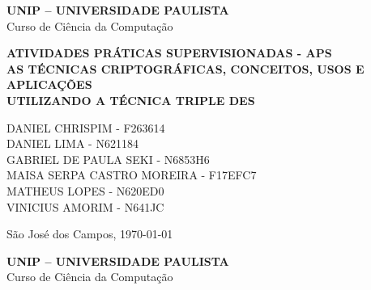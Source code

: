 \setmainfont{Arial}
\begin{titlepage} 

	\begin{center}
\begin{minipage}{1\textwidth} %
    \large
    \centering
    
        {\LARGE\bfseries UNIP – UNIVERSIDADE PAULISTA\\}
        {\LARGE Curso de Ciência da Computação}
\end{minipage}
\end{center}

  \begin{minipage}{\linewidth}
    \centering
  \end{minipage}
	
\vspace*{2in} %
	
\begin{center}

{\large\bfseries ATIVIDADES PRÁTICAS SUPERVISIONADAS - APS }\\[0.4cm] %
{\bfseries AS TÉCNICAS CRIPTOGRÁFICAS, CONCEITOS, USOS E APLICAÇÕES\\UTILIZANDO A TÉCNICA TRIPLE DES}\\[0.2cm]

\vfill

DANIEL CHRISPIM - F263614\\
DANIEL LIMA - N621184\\
GABRIEL DE PAULA SEKI - N6853H6\\
MAISA SERPA CASTRO MOREIRA - F17EFC7\\
MATHEUS LOPES - N620ED0\\
VINICIUS AMORIM - N641JC\\ %

\vfill

{São José dos Campos, \today}\\[0.4cm] %
\end{center}
\end{titlepage}

\newpage
    
    \begin{center}
\begin{minipage}{1\textwidth} %
    \large
    \centering
    
        {\LARGE\bfseries UNIP – UNIVERSIDADE PAULISTA\\}
        {\LARGE Curso de Ciência da Computação}
\end{minipage}
\end{center}
\begin{minipage}{\linewidth}
    \centering
  \end{minipage}
	
